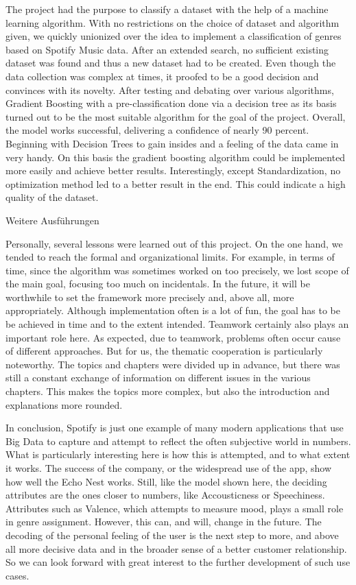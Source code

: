         The project had the purpose to classify a dataset with the help of a machine learning algorithm. With no restrictions on the choice of dataset and algorithm given, 
        we quickly unionized over the idea to implement a classification of genres based on Spotify Music data. After an extended search, 
        no sufficient existing dataset was found and thus a new dataset had to be created. Even though the data collection was complex at times, 
        it proofed to be a good decision and convinces with its novelty. After testing and debating over various algorithms, Gradient Boosting with 
        a pre-classification done via a decision tree as its basis turned out to be the most suitable algorithm for the goal of the project.
        Overall, the model works successful, delivering a confidence of nearly 90 percent. Beginning with Decision Trees to gain insides and a feeling of the data came in very handy. 
        On this basis the gradient boosting algorithm could be implemented more easily and achieve better results. Interestingly, except Standardization, 
        no optimization method led to a better result in the end. This could indicate a high quality of the dataset. 
        
        Weitere Ausführungen

        Personally, several lessons were learned out of this project. On the one hand, we tended to reach the formal and organizational limits. 
        For example, in terms of time, since the algorithm was sometimes worked on too precisely, we lost scope of the main goal, focusing too much on incidentals. 
        In the future, it will be worthwhile to set the framework more precisely and, above all, more appropriately. Although implementation often is a lot of fun, 
        the goal has to be be achieved in time and to the extent intended. Teamwork certainly also plays an important role here. As expected, due to teamwork, 
        problems often occur cause of different approaches. But for us, the thematic cooperation is particularly noteworthy. The topics and chapters were divided up in advance, 
        but there was still a constant exchange of information on different issues in the various chapters. This makes the topics more complex, but also the introduction and explanations more rounded.

        In conclusion, Spotify is just one example of many modern applications that use Big Data to capture and attempt to reflect the often subjective world in numbers. 
        What is particularly interesting here is how this is attempted, and to what extent it works. The success of the company, or the widespread use of the app, 
        show how well the Echo Nest works. Still, like the model shown here, the deciding attributes are the ones closer to numbers, like Accousticness or Speechiness. 
        Attributes such as Valence, which attempts to measure mood, plays a small role in genre assignment. However, this can, and will, change in the future. 
        The decoding of the personal feeling of the user is the next step to more, and above all more decisive data and in the broader sense of a better customer relationship. 
        So we can look forward with great interest to the further development of such use cases.

